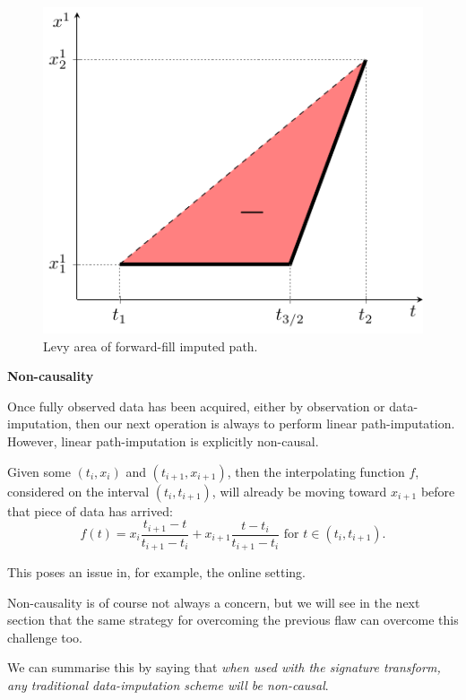 \documentclass{article}
\renewcommand{\subsubsection}[1]{\textbf{#1}

} %
\begin{document}
\begin{figure}[t]
    \centering
    \includegraphics[width=0.45 \columnwidth]{figures/sig_path3.pdf}
    \caption{Levy area of forward-fill imputed path.}\label{fig:bentline}
    \vspace{-1em}
\end{figure}

\subsubsection{Non-causality}

Once fully observed data has been acquired, either by observation or
data-imputation, then our next operation is always to perform linear
path-imputation.
%
However, linear path-imputation is explicitly non-causal.

Given some $(t_i, x_i)$ and $(t_{i+1}, x_{i + 1})$, then the interpolating function $f$, considered on the interval $(t_i, t_{i + 1})$, will already be moving toward $x_{i + 1}$ before that piece of data has arrived:
\begin{equation*}
    f(t) = x_{i} \frac{t_{i + 1} - t}{t_{i + 1} - t_i} + x_{i + 1} \frac{t - t_i}{t_{i + 1} - t_i}\text{ for }t \in (t_i, t_{i + 1}).
\end{equation*}

This poses an issue in, for example, the online setting.

Non-causality is of course not always a concern, but we will see in the next section that the same strategy for overcoming the previous flaw can overcome this challenge too.

We can summarise this by saying that \emph{when used with the signature transform, any traditional data-imputation scheme will be non-causal}.
\end{document}
